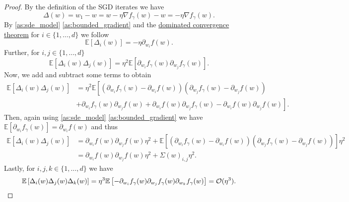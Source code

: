 \documentclass[12pt]{article}
\theoremstyle{definition}
\numberwithin{equation}{section}
\newcommand{\CO}{\mathcal{O}}
\newcommand{\ev}[1]{\mathbb{E}\left[{#1}\right]}
\begin{document}
\begin{proof}
  By the definition of the SGD iterates we have
  \begin{equation*}
    \Delta(w) = w_{1} - w = w - \eta \nabla f_{\gamma}(w) - w = - \eta \nabla f_{\gamma}(w).
  \end{equation*}
  By \autoref{as:sde_model} \ref{as:bounded_gradient} and the \hyperref[thm:dominated_convergence]{dominated convergence theorem} for $i \in \{1,\dots,d\}$ we follow
  \begin{equation*}
    \ev{\Delta_{i}(w)} = - \eta \partial_{w_i} f(w).
  \end{equation*}
  Further, for  $i,j \in \{1,\dots,d\}$
  \begin{equation*}
    \ev{\Delta_{i}(w)\Delta_{j}(w)} = \eta^2 \ev{\partial_{w_i}f_{\gamma}(w)\partial_{w_j}f_{\gamma}(w)}.
  \end{equation*}
  Now, we add and subtract some terms to obtain 
  \begin{align*}
    \ev{\Delta_{i}(w)\Delta_{j}(w)}
    &= \eta^2 \mathbb{E}\left[(\partial_{w_i}f_{\gamma}(w)- \partial_{w_i}f(w))(\partial_{w_j}f_{\gamma}(w) - \partial_{w_j}f(w)) \right. \\
    &+ \left. \partial_{w_i}f_{\gamma}(w)\partial_{w_j}f(w) + \partial_{w_i}f(w)\partial_{w_j}f_{\gamma}(w) - \partial_{w_i}f(w)\partial_{w_j}f(w) \right].
  \end{align*}
  Then, again using \autoref{as:sde_model} \ref{as:bounded_gradient} we have $\ev{\partial_{w_i}f_\gamma(w)} = \partial_{w_i}f(w)$ and thus
  \begin{align*}
    \ev{\Delta_{i}(w)\Delta_{j}(w)} &= \partial_{w_i} f(w)\partial_{w_j} f(w) \eta^2 + \ev{(\partial_{w_i}f_{\gamma}(w)- \partial_{w_i}f(w))(\partial_{w_j}f_{\gamma}(w) - \partial_{w_j}f(w))}\eta^2 \\
    &= \partial_{w_i} f(w)\partial_{w_j} f(w) \eta^2 + \Sigma(w)_{i,j}\eta^2.
  \end{align*}
  Lastly, for $i,j,k \in \{1,\dots,d\}$ we have
  \begin{equation*}
    \ev{\Delta_{i}(w)\Delta_{j}(w)\Delta_{k}(w)} = \eta^3 \ev{-\partial_{w_i}f_{\gamma}(w)\partial_{w_j}f_{\gamma}(w)\partial_{w_k}f_{\gamma}(w)} = \CO(\eta^3). \qedhere
  \end{equation*}
\end{proof}
\end{document}
